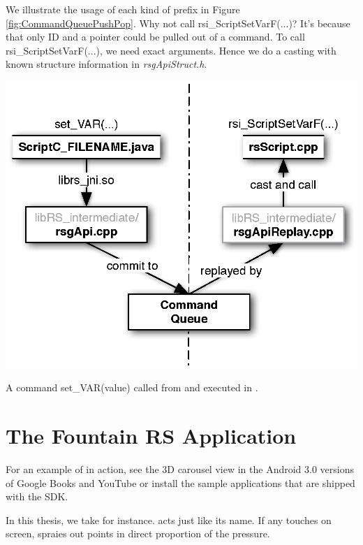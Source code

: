 We illustrate the usage of each kind of prefix in Figure \ref{fig:CommandQueuePushPop}. Why not call rsi\_ScriptSetVarF(...)? It's because that only ID and a pointer could be pulled out of a command. To call rsi\_ScriptSetVarF(...), we need exact arguments. Hence we do a casting with known structure information in \textit{rsgApiStruct.h}.
\begin{center-figure}
	\includegraphics[scale=0.8]{fig/CommandQueuePushPop.eps}
	\caption{A command set\_VAR(value) called from \Client{} and executed in \Core{}.}
	\label{fig:CommandQueuePushPop}
\end{center-figure}

\section{The Fountain RS Application}
\label{s:FountainWorkflow}
For an example of \RS{} in action, see the 3D carousel view in the Android 3.0 versions of Google Books and YouTube or install the \RS{} sample applications that are shipped with the SDK.

In this thesis, we take \Fountain{} for instance. \Fountain{} acts just like its name. If any touches on screen, \Fountain{} spraies out points in direct proportion of the pressure.


